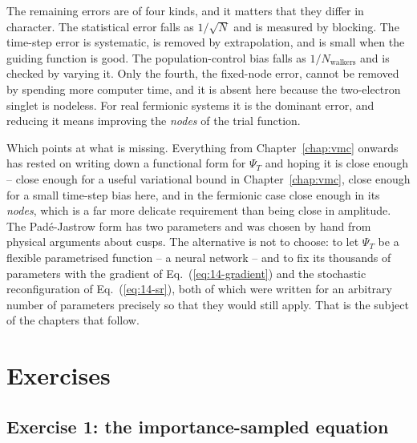 The remaining errors are of four kinds, and it matters that they differ in
character.  The statistical error falls as $1/\sqrt{N}$ and is measured by
blocking.  The time-step error is systematic, is removed by extrapolation, and
is small when the guiding function is good.  The population-control bias falls
as $1/N_{\mathrm{walkers}}$ and is checked by varying it.  Only the fourth,
the fixed-node error, cannot be removed by spending more computer time, and it
is absent here because the two-electron singlet is nodeless.  For real
fermionic systems it is the dominant error, and reducing it means improving
the \emph{nodes} of the trial function.

Which points at what is missing.  Everything from Chapter~\ref{chap:vmc}
onwards has rested on writing down a functional form for $\Psi_T$ and hoping
it is close enough -- close enough for a useful variational bound in
Chapter~\ref{chap:vmc}, close enough for a small time-step bias here, and in
the fermionic case close enough in its \emph{nodes}, which is a far more
delicate requirement than being close in amplitude.  The Pad\'e-Jastrow form
has two parameters and was chosen by hand from physical arguments about cusps.
The alternative is not to choose: to let $\Psi_T$ be a flexible parametrised
function -- a neural network -- and to fix its thousands of parameters with
the gradient of Eq.~(\ref{eq:14-gradient}) and the stochastic reconfiguration
of Eq.~(\ref{eq:14-sr}), both of which were written for an arbitrary number of
parameters precisely so that they would still apply.  That is the subject of
the chapters that follow.

\section{Exercises}

\subsection*{Exercise 1: the importance-sampled equation}
\label{ex:15-derivation}

